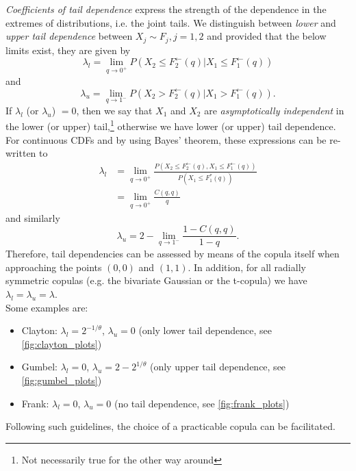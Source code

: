 
\textit{Coefficients of tail dependence} express the strength of the dependence in the extremes of distributions, i.e. the joint tails. We distinguish between \textit{lower} and \textit{upper tail dependence} between $X_j \sim F_j, j = 1,2$ and provided that the below limits exist, they are given by
\begin{equation}
\lambda_{l}=\lim \limits _ {q \rightarrow 0^+} P \left(X_{2} \leq F_{2}^{\leftarrow}(q) | X_{1} \leq F_{1}^{\leftarrow}(q)\right) 
\label{eq:lower_tail_dependence}
\end{equation}
and 
\begin{equation}
\lambda_{u}=\lim \limits _ {q \rightarrow 1^-} P \left(X_{2} > F_{2}^{\leftarrow}(q) | X_{1} > F_{1}^{\leftarrow}(q)\right).
\label{eq:upper_tail_dependence}
\end{equation}
If $\lambda_l$ (or $\lambda_u$) $=0$, then we say that $X_1$ and $X_2$ are \textit{asymptotically independent} in the lower (or upper) tail,\footnote{Not necessarily true for the other way around} otherwise we have lower (or upper) tail dependence.\\
For continuous \acp{CDF} and by using Bayes' theorem, these expressions can be re-written to
$$
\begin{aligned}
\lambda_{l} &=\lim _{q \rightarrow 0^+} \frac{P\left(X_{2} \leq F_{2}^{\leftarrow}(q), X_{1} \leq F_{1}^{\leftarrow}(q)\right)}{P\left(X_{1} \leq F_{1}^{*}(q)\right)} \\
&=\lim _{q \rightarrow 0^+} \frac{C(q, q)}{q}
\end{aligned}
$$
and similarly
$$
\lambda_u = 2-\lim _{q \rightarrow 1^-} \frac{1-C(q, q)}{1-q}.
$$
Therefore, tail dependencies can be assessed by means of the copula itself when approaching the points $(0,0)$ and $(1,1)$. In addition, for all radially symmetric copulas (e.g. the bivariate Gaussian or the t-copula) we have $\lambda_l = \lambda_u = \lambda$.\\
Some examples are:
\begin{itemize}
\item Clayton: $\lambda_l = 2^{-1/ \theta}$, $\lambda_u = 0$ (only lower tail dependence, see \autoref{fig:clayton_plots})
\item Gumbel: $\lambda_l = 0$, $\lambda_u = 2 - 2^{1/ \theta}$ (only upper tail dependence, see \autoref{fig:gumbel_plots})
\item Frank: $\lambda_l = 0$, $\lambda_u = 0$ (no tail dependence, see \autoref{fig:frank_plots})
\end{itemize}
Following such guidelines, the choice of a practicable copula can be facilitated.





